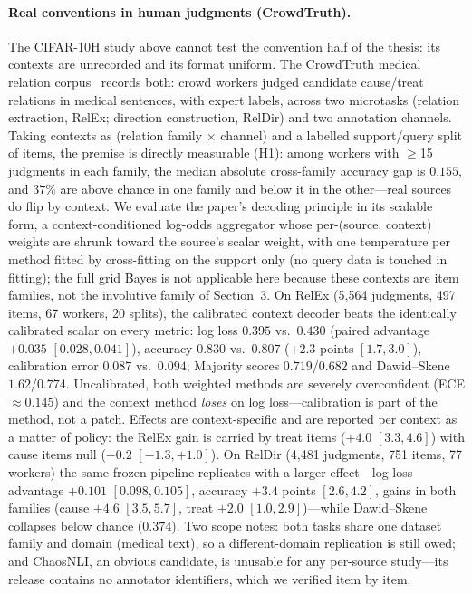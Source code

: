 \paragraph{Real conventions in human judgments (CrowdTruth).}
The CIFAR-10H study above cannot test the convention half of the
thesis: its contexts are unrecorded and its format uniform. The
CrowdTruth medical relation corpus~\cite{crowdtruthmedical} records
both: crowd workers judged candidate cause/treat relations in
medical sentences, with expert labels, across two microtasks
(relation extraction, RelEx; direction construction, RelDir) and
two annotation channels. Taking contexts as (relation family
$\times$ channel) and a labelled support/query split of items, the
premise is directly measurable (H1): among workers with $\geq$15
judgments in each family, the median absolute cross-family accuracy
gap is $0.155$, and $37\%$ are above chance in one family and below
it in the other---real sources do flip by context. We evaluate the
paper's decoding principle in its scalable form, a
context-conditioned log-odds aggregator whose per-(source, context)
weights are shrunk toward the source's scalar weight, with one
temperature per method fitted by cross-fitting on the support only
(no query data is touched in fitting); the full grid Bayes is not
applicable here because these contexts are item families, not the
involutive family of Section~3. On RelEx (5,564 judgments, 497
items, 67 workers, 20 splits), the calibrated context decoder beats
the identically calibrated scalar on every metric: log loss $0.395$
vs.\ $0.430$ (paired advantage $+0.035$ $[0.028, 0.041]$), accuracy
$0.830$ vs.\ $0.807$ ($+2.3$ points $[1.7, 3.0]$), calibration error
$0.087$ vs.\ $0.094$; Majority scores $0.719$/$0.682$ and
Dawid--Skene $1.62$/$0.774$. Uncalibrated, both weighted methods are
severely overconfident (ECE $\approx 0.145$) and the context method
\emph{loses} on log loss---calibration is part of the method, not a
patch. Effects are context-specific and are reported per context as
a matter of policy: the RelEx gain is carried by treat items
($+4.0$ $[3.3, 4.6]$) with cause items null ($-0.2$ $[-1.3, +1.0]$).
On RelDir (4,481 judgments, 751 items, 77 workers) the same frozen
pipeline replicates with a larger effect---log-loss advantage
$+0.101$ $[0.098, 0.105]$, accuracy $+3.4$ points $[2.6, 4.2]$,
gains in both families (cause $+4.6$ $[3.5, 5.7]$, treat $+2.0$
$[1.0, 2.9]$)---while Dawid--Skene collapses below chance
($0.374$). Two scope notes: both tasks share one dataset family and
domain (medical text), so a different-domain replication is still
owed; and ChaosNLI, an obvious candidate, is unusable for any
per-source study---its release contains no annotator identifiers,
which we verified item by item.

